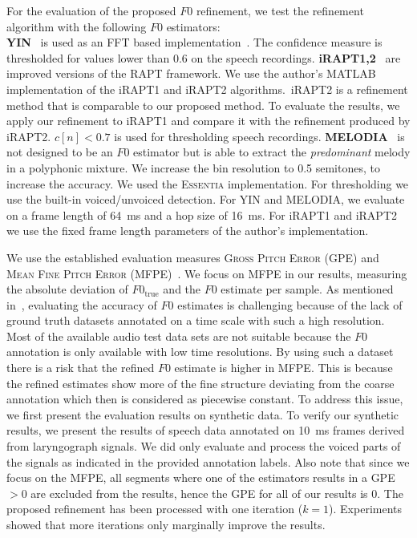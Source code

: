 For the evaluation of the proposed $F0$ refinement, we test the refinement algorithm with the following $F0$ estimators:\\
\textbf{YIN}~\cite{de2002yin} is used as an FFT based implementation~\cite{bogdanov2013essentia}. The confidence measure is thresholded for values lower than 0.6 on the speech recordings. \textbf{iRAPT1,2}~\cite{azarov2012instantaneous} are improved versions of the RAPT framework. We use the author's MATLAB implementation of the iRAPT1 and iRAPT2 algorithms.\ iRAPT2 is a refinement method that is comparable to our proposed method. To evaluate the results, we apply our refinement to iRAPT1 and compare it with the refinement produced by iRAPT2. $c[n] < 0.7$ is used for thresholding speech recordings. \textbf{MELODIA}~\cite{salamon2012melody} is not designed to be an $F0$ estimator but is able to extract the \emph{predominant} melody in a polyphonic mixture. We increase the bin resolution to 0.5 semitones, to increase the accuracy. We used the \textsc{Essentia} implementation. For thresholding we use the built-in voiced/unvoiced detection.
For YIN and MELODIA, we evaluate on a frame length of 64~ms and a hop size of 16~ms. For iRAPT1 and iRAPT2  we use the fixed frame length parameters of the author's implementation.
\par
We use the established evaluation measures \textsc{Gross Pitch Error} (GPE) and \textsc{Mean Fine Pitch Error} (MFPE)~\cite{azarov2012instantaneous}. We focus on MFPE in our results, measuring the absolute deviation of $F0_{\mathrm{true}}$ and the $F0$ estimate per sample.
As mentioned in~\cite{resch}, evaluating the accuracy of $F0$ estimates is challenging because of the lack of ground truth datasets annotated on a time scale with such a high resolution. Most of the available audio test data sets are not suitable because the $F0$ annotation is only available with low time resolutions. By using such a dataset there is a risk that the refined $F0$ estimate is higher in MFPE. This is because the refined estimates show more of the fine structure deviating from the coarse annotation which then is considered as piecewise constant. To address this issue, we first present the evaluation results on synthetic data. To verify our synthetic results, we present the results of speech data annotated on 10~ms frames derived from laryngograph signals. We did only evaluate and process the voiced parts of the signals as indicated in the provided annotation labels. Also note that since we focus on the MFPE, all segments where one of the estimators results in a GPE $> 0$ are excluded from the results, hence the GPE for all of our results is 0. The proposed refinement has been processed with one iteration ($k=1$). Experiments showed that more iterations only marginally improve the results.

